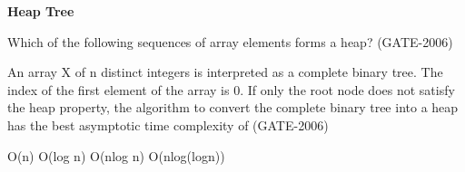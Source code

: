 
\centerline{\textbf{ \LARGE Heap Tree}}

\begin{questyle}
  \question  Which of the following sequences of array elements forms a heap?  (GATE-2006)

  \begin{choices}
  \end{choices}
\end{questyle}

\begin{questyle}
  \question  An array X of n distinct integers is interpreted as a complete binary tree. The index
            of the first element of the array is 0. If only the root node does not satisfy the heap
            property, the algorithm to convert the complete binary tree into a heap has the best
            asymptotic time complexity of  (GATE-2006)

  \begin{choices}
    \choice         O(n)
    \CorrectChoice  O(log n)
    \choice         O(nlog n)
    \choice         O(nlog(logn))
  \end{choices}
\end{questyle}
